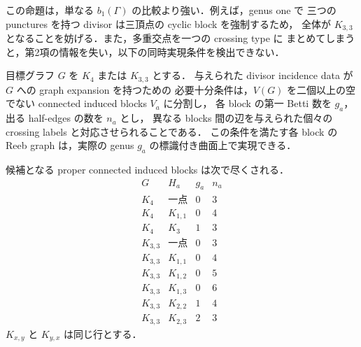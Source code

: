 この命題は，単なる $b_1(\Gamma)$ の比較より強い．例えば，genus one で
三つの punctures を持つ divisor は三頂点の cyclic block を強制するため，
全体が $K_{3,3}$ となることを妨げる．また，多重交点を一つの crossing type に
まとめてしまうと，第2項の情報を失い，以下の同時実現条件を検出できない．

\begin{lemma}
\label{q5:block-criterion}
目標グラフ $G$ を $K_4$ または $K_{3,3}$ とする．
与えられた divisor incidence data が $G$ への graph expansion を持つための
必要十分条件は，$V(G)$ を二個以上の空でない connected induced blocks $V_a$ に分割し，
各 block の第一 Betti 数を $g_a$，出る half-edges の数を $n_a$ とし，
異なる blocks 間の辺を与えられた個々の crossing labels と対応させられることである．
この条件を満たす各 block の Reeb graph は，実際の genus $g_a$ の標識付き曲面上で実現できる．

候補となる proper connected induced blocks は次で尽くされる．
\[
\begin{array}{c|c|c|c}
G&H_a&g_a&n_a\\\hline
K_4&\text{一点}&0&3\\
K_4&K_{1,1}&0&4\\
K_4&K_3&1&3\\\hline
K_{3,3}&\text{一点}&0&3\\
K_{3,3}&K_{1,1}&0&4\\
K_{3,3}&K_{1,2}&0&5\\
K_{3,3}&K_{1,3}&0&6\\
K_{3,3}&K_{2,2}&1&4\\
K_{3,3}&K_{2,3}&2&3
\end{array}
\]
$K_{x,y}$ と $K_{y,x}$ は同じ行とする．
\end{lemma}

